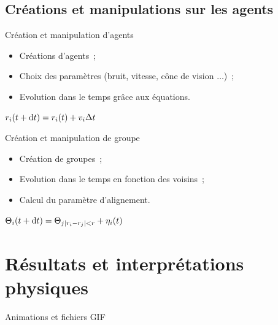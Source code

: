 \documentclass[aspectratio=43, a4paper, 12pt]{beamer}
\begin{document}
\subsection{Créations et manipulations sur les agents}
\begin{frame}{Création et manipulation d'agents}
\begin{itemize}
\item Créations d'agents~;
\item Choix des paramètres (bruit, vitesse, cône de vision $\dots$)~;
\item Evolution dans le temps grâce aux équations.
\end{itemize}
\vspace{1cm}
\begin{center}$r_{i}(t + \text dt)  =  r_{i}(t) + v_{i}\Delta t$\end{center}
\end{frame}

\begin{frame}{Création et manipulation de groupe}
\begin{itemize}
\item Création de groupes~;
\item Evolution dans le temps en fonction des voisins~;
\item Calcul du paramètre d'alignement.
\end{itemize}
\vspace{1cm}
\begin{center}$\Theta_{i}(t + \text dt)  =  \Theta_{j |r_{i}-r_{j}|<r} + \eta_{i}(t)$\end{center}
\end{frame}

\section{Résultats et interprétations physiques}
\begin{frame}{Animations et fichiers GIF}
\end{frame}
\end{document}
